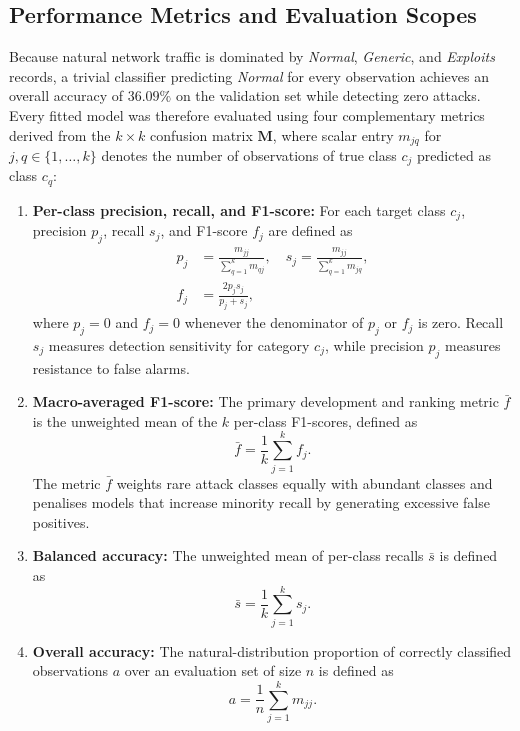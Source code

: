 \subsection{Performance Metrics and Evaluation Scopes}
\label{subsec:emp_metrics}
Because natural network traffic is dominated by \emph{Normal}, \emph{Generic}, and \emph{Exploits} records, a trivial classifier predicting \emph{Normal} for every observation achieves an overall accuracy of $36.09\%$ on the validation set while detecting zero attacks. Every fitted model was therefore evaluated using four complementary metrics derived from the $k \times k$ confusion matrix $\mathbf{M}$, where scalar entry $m_{jq}$ for $j, q \in \{1, \dots, k\}$ denotes the number of observations of true class $c_j$ predicted as class $c_q$:
\begin{enumerate}
    \item \textbf{Per-class precision, recall, and F1-score:} For each target class $c_j$, precision $p_j$, recall $s_j$, and F1-score $f_j$ are defined as
    \begin{equation}
    \begin{aligned}
        p_j &= \frac{m_{jj}}{\sum_{q=1}^k m_{qj}}, \quad
        s_j = \frac{m_{jj}}{\sum_{q=1}^k m_{jq}}, \\
        f_j &= \frac{2 p_j s_j}{p_j + s_j},
    \end{aligned}
    \label{eq:per_class_metrics}
    \end{equation}
    where $p_j = 0$ and $f_j = 0$ whenever the denominator of $p_j$ or $f_j$ is zero. Recall $s_j$ measures detection sensitivity for category $c_j$, while precision $p_j$ measures resistance to false alarms.
    \item \textbf{Macro-averaged F1-score:} The primary development and ranking metric $\bar{f}$ is the unweighted mean of the $k$ per-class F1-scores, defined as
    \begin{equation}
        \bar{f} = \frac{1}{k} \sum_{j=1}^k f_j.
        \label{eq:macro_f1}
    \end{equation}
    The metric $\bar{f}$ weights rare attack classes equally with abundant classes and penalises models that increase minority recall by generating excessive false positives.
    \item \textbf{Balanced accuracy:} The unweighted mean of per-class recalls $\bar{s}$ is defined as
    \begin{equation}
        \bar{s} = \frac{1}{k} \sum_{j=1}^k s_j.
        \label{eq:bal_acc}
    \end{equation}
    \item \textbf{Overall accuracy:} The natural-distribution proportion of correctly classified observations $a$ over an evaluation set of size $n$ is defined as
    \begin{equation}
        a = \frac{1}{n} \sum_{j=1}^k m_{jj}.
        \label{eq:overall_acc}
    \end{equation}
\end{enumerate}

